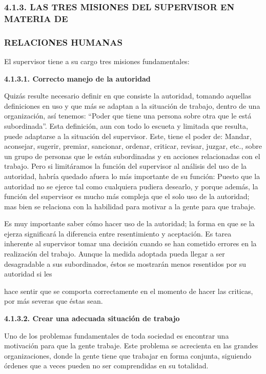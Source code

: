 \subsubsection*{4.1.3. LAS TRES MISIONES DEL SUPERVISOR EN MATERIA DE}
\subsubsection*{RELACIONES HUMANAS}
El supervisor tiene a su cargo tres misiones fundamentales:

\textbf{4.1.3.1. Correcto manejo de la autoridad}

Quizás resulte necesario definir en que consiste la autoridad, tomando aquellas definiciones en uso y que más se adaptan a la situación de trabajo, dentro de una organización, así tenemos: “Poder que tiene una persona sobre otra que le está subordinada”. Esta definición, aun con todo lo escueta y limitada que resulta, puede adaptarse a la situación del supervisor. Este, tiene el poder de: Mandar, aconsejar, sugerir, premiar, sancionar, ordenar, criticar, revisar, juzgar, etc., sobre un grupo de personas que le están subordinadas y en acciones relacionadas con el trabajo. Pero si limitáramos la función del supervisor al análisis del uso de la autoridad, habría quedado afuera lo más importante de su función: Puesto que la autoridad no se ejerce tal como cualquiera pudiera desearlo, y porque además, la función del supervisor es mucho más compleja que el solo uso de la autoridad; mas bien se relaciona con la habilidad para motivar a la gente para que trabaje.

Es muy importante saber cómo hacer uso de la autoridad; la forma en que se la ejerza significará la diferencia entre resentimiento y aceptación. Es tarea inherente al supervisor tomar una decisión cuando se han cometido errores en la realización del trabajo. Aunque la medida adoptada pueda llegar a ser desagradable a sus subordinados, éstos se mostrarán menos resentidos por su autoridad si les



hace sentir que se comporta correctamente en el momento de hacer las criticas, por más severas que éstas sean.

\textbf{4.1.3.2. Crear una adecuada situación de trabajo}

Uno de los problemas fundamentales de toda sociedad es encontrar una motivación para que la gente trabaje. Este problema se acrecienta en las grandes organizaciones, donde la gente tiene que trabajar en forma conjunta, siguiendo órdenes que a veces pueden no ser comprendidas en su totalidad.

